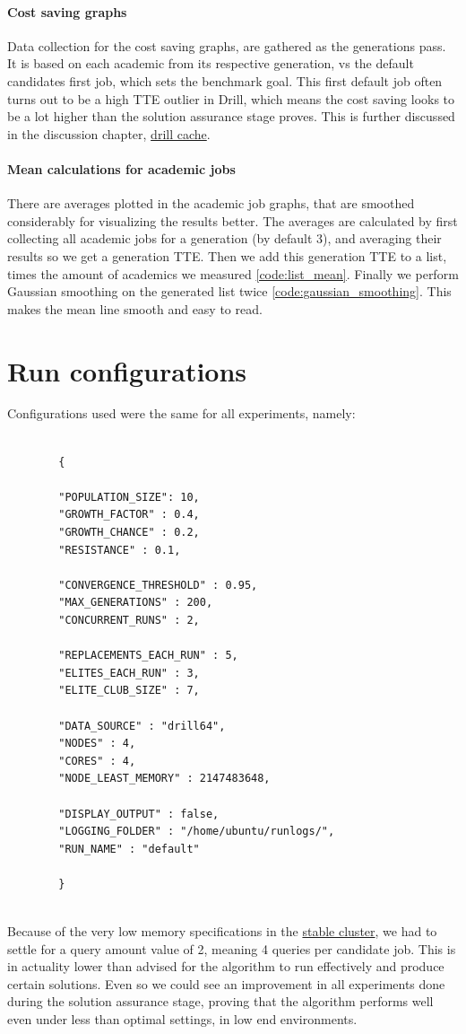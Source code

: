 \documentclass[a4paper,english]{report}
\begin{document}
	\paragraph{Cost saving graphs}
	Data collection for the cost saving graphs, are gathered as the generations pass. It is based on each academic from its respective generation, vs the default candidates first job, which sets the benchmark goal. This first default job often turns out to be a high TTE outlier in Drill, which means the cost saving looks to be a lot higher than the solution assurance stage proves. This is further discussed in the discussion chapter, \hyperref[sec:cache]{drill cache}.
	\paragraph{Mean calculations for academic jobs}
	There are averages plotted in the academic job graphs, that are smoothed considerably for visualizing the results better. The averages are calculated by first collecting all academic jobs for a generation (by default 3), and averaging their results so we get a generation TTE. Then we add this generation TTE to a list, times the amount of academics we measured \ref{code:list_mean}. Finally we perform Gaussian smoothing on the generated list twice \ref{code:gaussian_smoothing}. This makes the mean line smooth and easy to read.
	\clearpage
	\section{Run configurations}
	Configurations used were the same for all experiments, namely:
	\begin{verbatim}
	
		{
		
		"POPULATION_SIZE": 10,
		"GROWTH_FACTOR" : 0.4,
		"GROWTH_CHANCE" : 0.2,
		"RESISTANCE" : 0.1,
		
		"CONVERGENCE_THRESHOLD" : 0.95,
		"MAX_GENERATIONS" : 200,
		"CONCURRENT_RUNS" : 2,
		
		"REPLACEMENTS_EACH_RUN" : 5,
		"ELITES_EACH_RUN" : 3,
		"ELITE_CLUB_SIZE" : 7,
		
		"DATA_SOURCE" : "drill64",
		"NODES" : 4,
		"CORES" : 4,
		"NODE_LEAST_MEMORY" : 2147483648,
		
		"DISPLAY_OUTPUT" : false,
		"LOGGING_FOLDER" : "/home/ubuntu/runlogs/",
		"RUN_NAME" : "default"
		
		}
		
	\end{verbatim}
	Because of the very low memory specifications in the \hyperref[table:cluster_stable]{stable cluster}, we had to settle for a query amount value of 2, meaning 4 queries per candidate job. This is in actuality lower than advised for the algorithm to run effectively and produce certain solutions. Even so we could see an improvement in all experiments done during the solution assurance stage, proving that the algorithm performs well even under less than optimal settings, in low end environments.
	\clearpage
\end{document}
